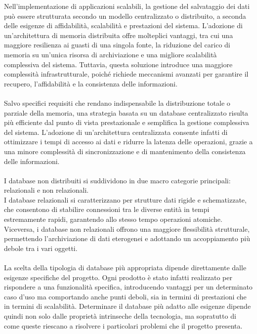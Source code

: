 Nell’implementazione di applicazioni scalabili, la gestione del salvataggio dei dati 
può essere strutturata secondo un modello centralizzato o distribuito, 
a seconda delle esigenze di affidabilità, scalabilità e prestazioni del sistema. 
L’adozione di un’architettura di memoria distribuita offre molteplici vantaggi, 
tra cui una maggiore resilienza ai guasti di una singola fonte, 
la riduzione del carico di memoria su un'unica risorsa di archiviazione e 
una migliore scalabilità complessiva del sistema. 
Tuttavia, questa soluzione introduce una maggiore complessità infrastrutturale, 
poiché richiede meccanismi avanzati per garantire il recupero, 
l'affidabilità e la consistenza delle informazioni.\\
\\
Salvo specifici requisiti che rendano indispensabile la distribuzione totale o parziale della memoria, 
una strategia basata su un database centralizzato risulta più efficiente 
dal punto di vista prestazionale e semplifica la gestione complessiva del sistema. 
L’adozione di un’architettura centralizzata consente infatti 
di ottimizzare i tempi di accesso ai dati e ridurre la latenza delle operazioni, 
grazie a una minore complessità di sincronizzazione e 
di mantenimento della consistenza delle informazioni.\\
\\
I database non distribuiti si suddividono in due macro categorie principali: relazionali e non relazionali.\\
I database relazionali si caratterizzano per strutture dati rigide e schematizzate, 
che consentono di stabilire connessioni tra le diverse entità in tempi estremamente rapidi,
garantendo allo stesso tempo operazioni atomiche.
Viceversa, i database non relazionali offrono una maggiore flessibilità strutturale, 
permettendo l’archiviazione di dati eterogenei e adottando un accoppiamento più debole tra i vari oggetti. \\
\\
La scelta della tipologia di database più appropriata dipende direttamente
dalle esigenze specifiche del progetto.
Ogni prodotto è stato infatti realizzato per rispondere a una funzionalità specifica,
introducendo vantaggi per un determinato caso d'uso ma comportando anche punti deboli,
sia in termini di prestazioni che in termini di scalabilità.
Determinare il database più adatto alle esigenze dipende 
quindi non solo dalle proprietà intrinseche della tecnologia,
ma sopratutto di come queste riescano a risolvere i particolari problemi che il progetto presenta.
\clearpage

